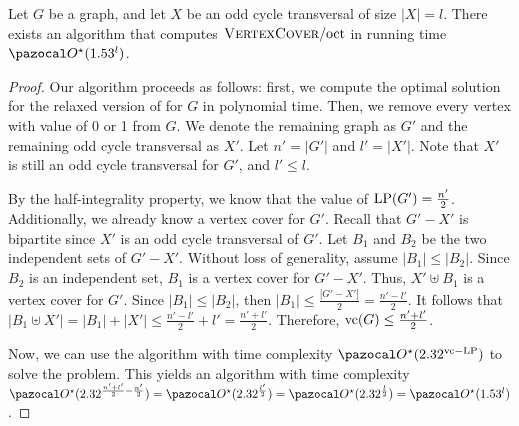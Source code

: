 \begin{theorem}
    Let $G$ be a graph, and let $X$ be an odd cycle transversal of size $|X| = l$. There exists an algorithm that computes $\textsc{VertexCover}/\text{oct}$ in running time $\O^\star(1.53^l)$.
\end{theorem}

\begin{proof}
    Our algorithm proceeds as follows: first, we compute the optimal solution for the relaxed version of  for $G$ in polynomial time. Then, we remove every vertex with value of 0 or 1 from $G$. We denote the remaining graph as $G'$ and the remaining odd cycle transversal as $X'$. Let $n' = |G'|$ and $l' = |X'|$. Note that $X'$ is still an odd cycle transversal for $G'$, and $l' \leq l$.

    By the half-integrality property, we know that the value of $\text{LP}(G') = \frac{n'}{2}$. Additionally, we already know a vertex cover for $G'$. Recall that $G' - X'$ is bipartite since $X'$ is an odd cycle transversal of $G'$. Let $B_1$ and $B_2$ be the two independent sets of $G' - X'$. Without loss of generality, assume $|B_1| \leq |B_2|$. Since $B_2$ is an independent set, $B_1$ is a vertex cover for $G' - X'$. Thus, $X' \uplus B_1$ is a vertex cover for $G'$. Since $|B_1| \leq |B_2|$, then $|B_1| \leq \frac{|G' - X'|}{2} = \frac{n' - l'}{2}$. It follows that $|B_1 \uplus X'| = |B_1| + |X'| \leq \frac{n' - l'}{2} + l' = \frac{n' + l'}{2}$. Therefore, $\text{vc}(G) \leq \frac{n' + l'}{2}$.

    Now, we can use the algorithm with time complexity $\O^\star(2.32^{\vc - \LP})$ to solve the problem. This yields an algorithm with time complexity $\O^\star(2.32^{\frac{n' + l'}{2} - \frac{n'}{2}}) = \O^\star(2.32^{\frac{l'}{2}}) = \O^\star(2.32^{\frac{l}{2}}) = \O^\star(1.53^l)$.
\end{proof}
